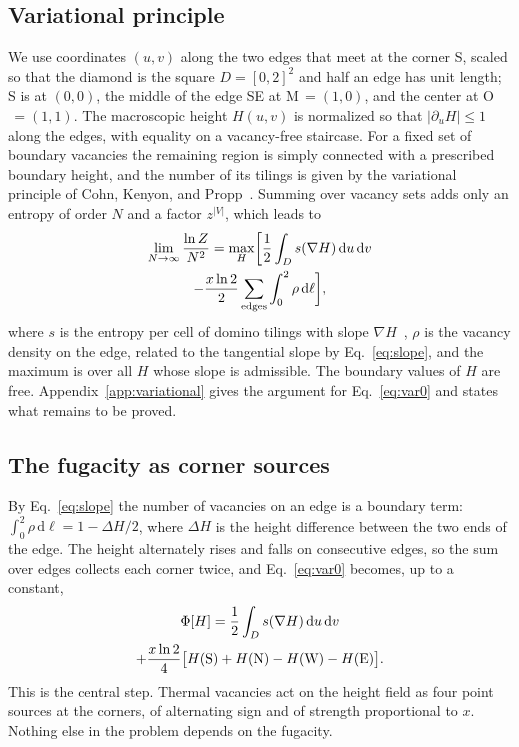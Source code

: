 \documentclass[reprint,aps,pre,superscriptaddress,longbibliography,floatfix,amsmath,amssymb]{revtex4-2}
\newcommand{\dd}{\mathrm{d}}
\begin{document}
\subsection{Variational principle}

We use coordinates $(u,v)$ along the two edges that meet at the corner S, scaled so that the diamond is the square $D=[0,2]^2$ and half an edge has unit length; S is at $(0,0)$, the middle of the edge SE at M$\,=(1,0)$, and the center at O$\,=(1,1)$. The macroscopic height $H(u,v)$ is normalized so that $|\partial_uH|\le1$ along the edges, with equality on a vacancy-free staircase. For a fixed set of boundary vacancies the remaining region is simply connected with a prescribed boundary height, and the number of its tilings is given by the variational principle of Cohn, Kenyon, and Propp~\cite{cohn2001}. Summing over vacancy sets adds only an entropy of order $N$ and a factor $z^{|V|}$, which leads to
\begin{multline}\label{eq:var0}
  \lim_{N\to\infty}\frac{\ln Z}{N^2}=\max_{H}\biggl[\frac12\int_D s(\nabla H)\,\dd u\,\dd v\\
  -\frac{x\ln2}{2}\sum_{\rm edges}\int_0^2\rho\,\dd\ell\biggr],
\end{multline}
where $s$ is the entropy per cell of domino tilings with slope $\nabla H$~\cite{cohn2001}, $\rho$ is the vacancy density on the edge, related to the tangential slope by Eq.~\eqref{eq:slope}, and the maximum is over all $H$ whose slope is admissible. The boundary values of $H$ are free. Appendix~\ref{app:variational} gives the argument for Eq.~\eqref{eq:var0} and states what remains to be proved.

\subsection{The fugacity as corner sources}

By Eq.~\eqref{eq:slope} the number of vacancies on an edge is a boundary term: $\int_0^2\rho\,\dd\ell=1-\Delta H/2$, where $\Delta H$ is the height difference between the two ends of the edge. The height alternately rises and falls on consecutive edges, so the sum over edges collects each corner twice, and Eq.~\eqref{eq:var0} becomes, up to a constant,
\begin{multline}\label{eq:var}
  \Phi[H]=\frac12\int_D s(\nabla H)\,\dd u\,\dd v\\
  +\frac{x\ln2}{4}\bigl[H({\rm S})+H({\rm N})-H({\rm W})-H({\rm E})\bigr].
\end{multline}
This is the central step. Thermal vacancies act on the height field as four point sources at the corners, of alternating sign and of strength proportional to $x$. Nothing else in the problem depends on the fugacity.
\end{document}
